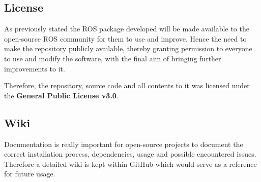 \subsection{License}

As previously stated the ROS package developed will be made available to the open-source ROS community for them to use and improve. Hence the need to make the repository publicly available, thereby granting permission to everyone to use and modify the software, with the final aim of bringing further improvements to it.

Therefore, the repository, source code and all contents to it was licensed under the \textbf{General Public License v3.0}.

\subsection{Wiki}

Documentation is really important for open-source projects to document the correct installation process, dependencies, usage and possible encountered issues. Therefore a detailed wiki is kept within GitHub which would serve as a reference for future usage. 